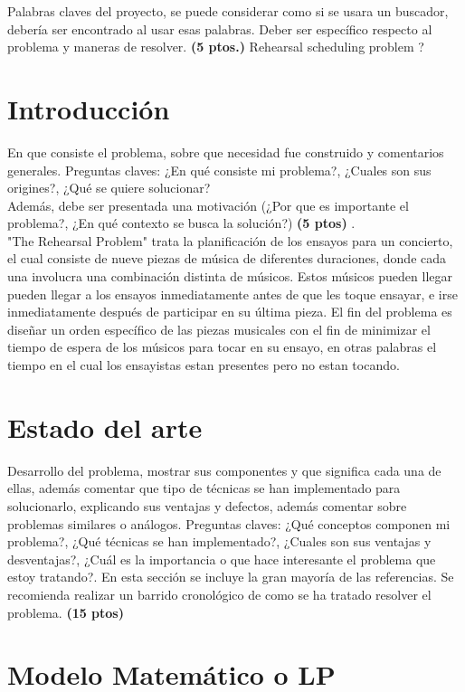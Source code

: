 \documentclass[journal, 10pt]{IEEEtran}
\begin{document}
\begin{IEEEkeywords}
Palabras claves del proyecto, se puede considerar como si se usara un buscador, debería ser encontrado al usar esas palabras. Deber ser específico respecto al problema y maneras de resolver. \textbf{(5 ptos.)} Rehearsal scheduling problem ?
\end{IEEEkeywords}

\section{Introducción}
En que consiste el problema, sobre que necesidad fue construido y comentarios generales. Preguntas claves: ¿En qué consiste mi problema?, ¿Cuales son sus origines?, ¿Qué se quiere solucionar?\\
Además, debe ser presentada una motivación (¿Por que es importante el problema?, ¿En qué contexto se busca la solución?) \textbf{(5 ptos)} .\\ "The Rehearsal Problem" trata la planificación de los ensayos para un concierto, el cual consiste de nueve piezas de música de diferentes duraciones, donde cada una involucra una combinación distinta de músicos. Estos músicos pueden llegar pueden llegar a los ensayos inmediatamente antes de que les toque ensayar, e irse inmediatamente después de participar en su última pieza. El fin del problema es diseñar un orden específico de las piezas musicales con el fin de minimizar el tiempo de espera de los músicos para tocar en su ensayo, en otras palabras el tiempo en el cual los ensayistas estan presentes pero no estan tocando. 

\section{Estado del arte}
Desarrollo del problema, mostrar sus componentes y que significa cada una de ellas, además comentar que tipo de técnicas se han implementado para solucionarlo, explicando sus ventajas y defectos, además comentar sobre problemas similares o análogos. Preguntas claves: ¿Qué conceptos componen mi problema?, ¿Qué técnicas se han implementado?, ¿Cuales son sus ventajas y desventajas?, ¿Cuál es la importancia o que hace interesante el problema que estoy tratando?. En esta sección se incluye la gran mayoría de las referencias. Se recomienda realizar un barrido cronológico de como se ha tratado resolver el problema. \textbf{(15 ptos)}

\section{Modelo Matemático o LP}
\end{document}
